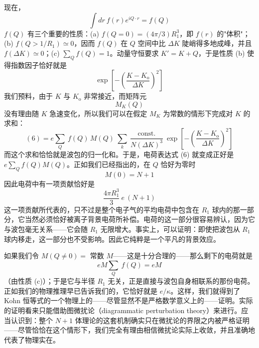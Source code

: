 现在，
\begin{equation*}
\int dr\ f(r)e^{iQ\cdot r} = f(Q)
\end{equation*}
$f(Q)$ 有三个重要的性质：(a) $f(Q=0)=(4\pi/3)R_{1}^{3}$，即 $f(r)$ 的"体积"；(b) $f(Q>1/R_{1})\simeq 0$，因而 $f(Q)$ 在 $Q$ 空间中比 $\Delta K$ 陡峭得多地成峰，并且 $f(\Delta K)\simeq 0$；(c) $\sum_{Q}f(Q)=1$。动量守恒要求 $K'=K+Q$，于是性质 (b) 使得指数因子恰好就是
\begin{equation*}
\exp\left[-\left(\frac{K-K_{\mathrm{o}}}{\Delta K}\right)^{2}\right]
\end{equation*}
我们预料，由于 $K$ 与 $K_{\mathrm{o}}$ 非常接近，而矩阵元
\begin{equation*}
M_{K}(Q)
\end{equation*}
没有理由随 $K$ 急速变化，所以我们可以在假定 $M_{K}$ 为常数的情形下完成对 $K$ 的求和：
\begin{equation*}
(6) = e\sum_{Q}\ f(Q)\,M(Q)\ \sum_{k}\ \frac{\text{const.}}{N(\Delta K)^{3}}\ \exp\left[-\left(\frac{K-K_{\mathrm{o}}}{\Delta K}\right)^{2}\right]
\end{equation*}
而这个求和恰恰就是波包的归一化和。于是，电荷表达式 (6) 就变成正好是 $e\sum_{Q}f(Q)M(Q)$。正如我们已经指出的，在 $Q$ 恰好为零时
\begin{equation*}
M(0) = N + 1
\end{equation*}
因此电荷中有一项贡献恰好是
\begin{equation*}
\frac{4\pi R_{1}^{3}}{3}\ e\ (N+1)
\end{equation*}
这一项贡献所代表的，只不过是整个电子气的平均电荷中包含在 $R_{1}$ 球内的那一部分，它当然必须恰好被离子背景电荷所补偿。电荷的这一部分很容易辨认，因为它与波包毫无关系——它会随 $R_{1}$ 无限增大。事实上，可以证明：即使把波包从 $R_{1}$ 球内移走，这一部分也不受影响。因此它纯粹是一个平凡的背景效应。

如果我们令 $M(Q\neq 0)=$ 常数 $M$——这是十分合理的——那么剩下的电荷就是
\begin{equation*}
eM\sum_{Q}\ f(Q) = eM
\end{equation*}
（由性质 (c)）；于是它与半径 $R_1$ 无关，正是直接与波包自身相联系的那份电荷。正如我们的物理推理早已告诉我们的，它恰好就是 $e/\kappa$。这样，我们就得到了 Kohn 恒等式的一个物理上的——尽管显然不是严格数学意义上的——证明。实际的证明看来只能借助图微扰论（diagrammatic perturbation theory）来进行。应当认识到：整个 $N{+}1$ 体理论的这套机制确实只在微扰论的界限之内被严格证明——尽管恰恰在这个情形下，我们完全有理由相信微扰论实际上收敛，并且准确地代表了物理实在。

